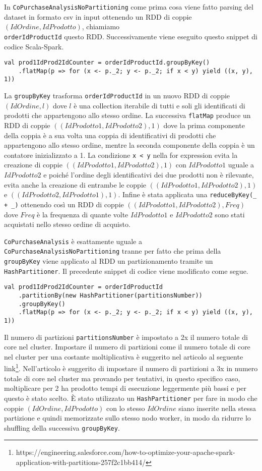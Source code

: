\documentclass{article}
\begin{document}
In \verb|CoPurchaseAnalysisNoPartitioning| come prima cosa viene fatto parsing del dataset in formato csv in input ottenendo un RDD di coppie $(IdOrdine, IdProdotto)$, chiamiamo\\ \verb|orderIdProductId| questo RDD. Successivamente viene eseguito questo snippet di codice Scala-Spark.
\begin{verbatim}
val prod1IdProd2IdCounter = orderIdProductId.groupByKey()
    .flatMap(p => for (x <- p._2; y <- p._2; if x < y) yield ((x, y), 1))
\end{verbatim}
La \verb|groupByKey| trasforma \verb|orderIdProductId| in un nuovo RDD di coppie $(IdOrdine, l)$ dove $l$ è una collection iterabile di tutti e soli gli identificati di prodotti che appartengono allo stesso ordine.
La successiva \verb|flatMap| produce un RDD di coppie $((IdProdotto1, IdProdotto2), 1)$ dove la prima componente della coppia è a sua volta una coppia di identificativi di prodotti che appartengono allo stesso ordine, mentre la seconda componente della coppia è un contatore inizializzato a 1.
La condizione \verb|x < y| nella for expression evita la creazione di coppie $((IdProdotto1, IdProdotto2), 1)$ con $IdProdotto1$ uguale a $IdProdotto2$ e poiché l'ordine degli identificativi dei due prodotti non è rilevante, evita anche la creazione di entrambe le coppie $((IdProdotto1, IdProdotto2), 1)$ e $((IdProdotto2, IdProdotto1), 1)$.
Infine è stata applicata una \verb|reduceByKey(_ + _)| ottenendo così un RDD di coppie $((IdProdotto1, IdProdotto2), Freq)$ dove $Freq$ è la frequenza di quante volte $IdProdotto1$ e $IdProdotto2$ sono stati acquistati nello stesso ordine di acquisto.

\verb|CoPurchaseAnalysis| è esattamente uguale a \verb|CoPurchaseAnalysisNoPartitioning| tranne per fatto che prima della \verb|groupByKey| viene applicato al RDD un partizionamento tramite un \verb|HashPartitioner|. Il precedente snippet di codice viene modificato come segue.
\newpage
\begin{verbatim}
val prod1IdProd2IdCounter = orderIdProductId
    .partitionBy(new HashPartitioner(partitionsNumber))
    .groupByKey()
    .flatMap(p => for (x <- p._2; y <- p._2; if x < y) yield ((x, y), 1))
\end{verbatim}
Il numero di partizioni \verb|partitionsNumber| è impostato a 2x il numero totale di core nel cluster.
Impostare il numero di partizioni come il numero totale di core nel cluster per una costante moltiplicativa è suggerito nel articolo al seguente link\footnote{https://engineering.salesforce.com/how-to-optimize-your-apache-spark-application-with-partitions-257f2c1bb414/}.
Nell'articolo è suggerito di impostare il numero di partizioni a 3x in numero totale di core nel cluster ma provando per tentativi, in questo specifico caso, moltiplicare per 2 ha prodotto tempi di esecuzione leggermente più bassi e per questo è stato scelto.
È stato utilizzato un \verb|HashPartitioner| per fare in modo che coppie $(IdOrdine, IdProdotto)$ con lo stesso $IdOrdine$ siano inserite nella stessa partizione e quindi memorizzate sullo stesso nodo worker, in modo da ridurre lo shuffling della successiva \verb|groupByKey|.
\end{document}
